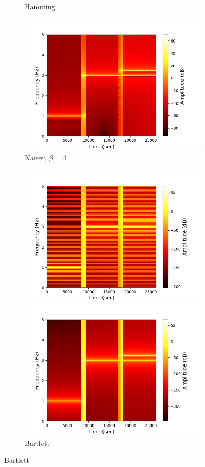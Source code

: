 \begin{figure}[H]
\begin{subfigure}{0.49\textwidth}
\caption{Hamming}
\label{fig:stft_hamming}
\includegraphics[width=\textwidth]{figures/stft_windows/kaiser/10000/4.png}
\caption{Kaiser, $\beta=4$}
\label{fig:stft_kaiser_10000_4}
\end{subfigure}
\begin{subfigure}{0.49\textwidth}
\centering
\includegraphics[width=\textwidth]{figures/stft_windows/bartlett_10000.png}
\caption{Bartlett}
\label{fig:stft_bartlett}
\includegraphics[width=\textwidth]{figures/stft_windows/blackman_10000.png}

\end{subfigure}
\end{figure}
